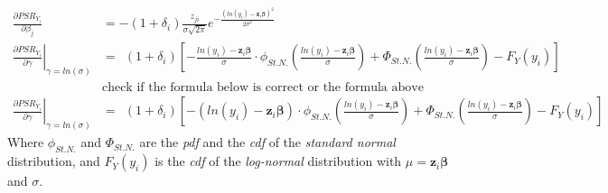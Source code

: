 \documentclass[]{article}
\begin{document}
  $$
  \begin{aligned}
    \frac{\partial PSR_{Y_i}}{\partial \beta_j} & =  -(1+\delta_i) \frac{z_{ji} }{\sigma\sqrt{2\pi} }    e^{ - \frac{\left( ln(y_i) -\pmb{z}_i\pmb{\beta} \right)^2}{2\sigma^2} }\\
    \left.\frac{\partial PSR_{Y_i}}{\partial \gamma}\right|_{\gamma = ln(\sigma)} &=~~(1+\delta_i)\left[    -\frac{ln(y_i) - \pmb{z}_i\pmb{\beta}}{\sigma}\cdot\phi_{St.N.}\left(  \frac{ln(y_i) - \pmb{z}_i\pmb{\beta}}{\sigma}  \right)   +  \Phi_{St.N.}\left(  \frac{ln(y_i) - \pmb{z}_i\pmb{\beta}}{\sigma}  \right) - F_Y(y_i)    \right]\\
    &\text{check if the formula below is correct or the formula above}\\
    \left.\frac{\partial PSR_{Y_i}}{\partial \gamma}\right|_{\gamma = ln(\sigma)} &=~~(1+\delta_i)\left[    -\left(ln(y_i) - \pmb{z}_i\pmb{\beta}\right)\cdot\phi_{St.N.}\left(  \frac{ln(y_i) - \pmb{z}_i\pmb{\beta}}{\sigma}  \right)   +  \Phi_{St.N.}\left(  \frac{ln(y_i) - \pmb{z}_i\pmb{\beta}}{\sigma}  \right) - F_Y(y_i)    \right]
  \end{aligned}
  $$
Where $\phi_{St.N.}$ and $\Phi_{St.N.}$ are the \emph{pdf} and the \emph{cdf} of the \emph{standard normal} distribution, and $F_Y(y_i)$ is the \emph{cdf} of the \emph{log-normal} distribution with $\mu = \pmb{z}_i\pmb{\beta}$ and $\sigma$.
\end{document}

